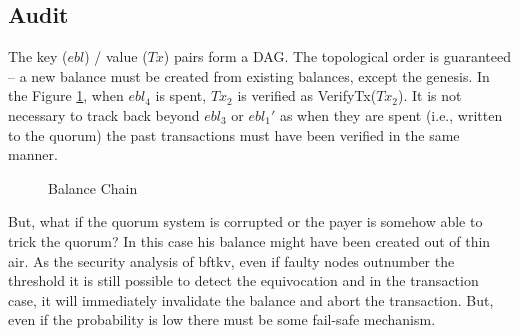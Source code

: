 \documentclass[10pt,fleqn]{article}
\begin{document}
\subsection{Audit}
\label{Audit}
The key ($ebl$) / value ($Tx$) pairs form a DAG. The topological order is guaranteed -- a new balance must be created from existing balances, except the genesis. In the Figure \ref{dag}, when $ebl_4$ is spent, $Tx_2$ is verified as {\sf VerifyTx}($Tx_2$). It is not necessary to track back beyond $ebl_3$ or $ebl_1'$ as when they are spent (i.e., written to the quorum) the past transactions must have been verified in the same manner.

\begin{figure}[h]
\begin{center}
\caption{Balance Chain}
\label{dag}
\end{center}
\end{figure}

But, what if the quorum system is corrupted or the payer is somehow able to trick the quorum? In this case his balance might have been created out of thin air. As the security analysis of \textsf{bftkv}, even if faulty nodes outnumber the threshold it is still possible to detect the equivocation and in the transaction case, it will immediately invalidate the balance and abort the transaction. But, even if the probability is low there must be some fail-safe mechanism.
\end{document}
